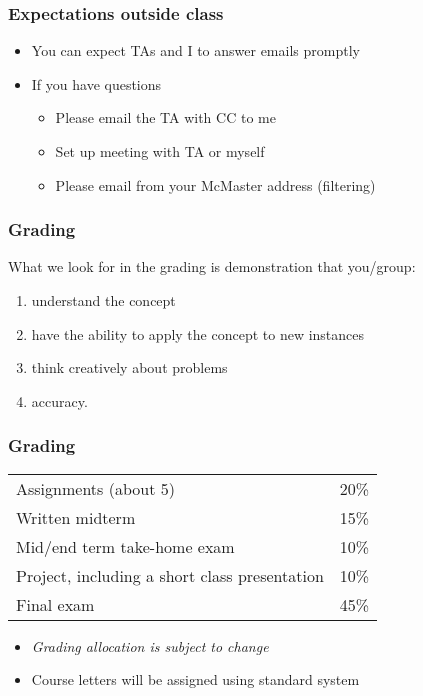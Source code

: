 \begin{frame}\frametitle{Expectations outside class}
	\begin{itemize}
		\item	You can expect TAs and I to answer emails promptly
		\item	If you have questions
			\begin{itemize}
				\item	Please email the TA with CC to me 
				\item	Set up meeting with TA or myself
				\item	Please email from your McMaster address (filtering)
			\end{itemize}
	\end{itemize}
\end{frame}

\begin{frame}\frametitle{Grading}
	What we look for in the grading is demonstration that you/group:
	\begin{enumerate}
		\item	understand the concept
		\item	have the ability to apply the concept to new instances
		\item	think creatively about problems
		\item	accuracy.
	\end{enumerate}
\end{frame}

\begin{frame}\frametitle{Grading}
	\begin{tabular}{ll}\\
		Assignments (about 5)       	& 20\% \\
	    Written midterm        			& 15\% \\
	    Mid/end term take-home exam		& 10\% \\
	    Project, including a short class presentation& 10\% \\
	    Final exam 						& 45\% \\
	\end{tabular}
	
	\vspace{12pt}
	\vspace{12pt}
	
	\begin{itemize}
		\item	\emph{Grading allocation is subject to change}
		\item	Course letters will be assigned using standard system
	\end{itemize}
\end{frame}

